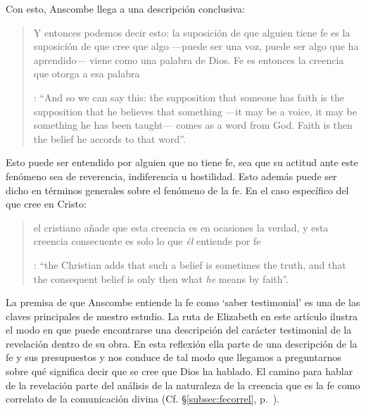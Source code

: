 Con esto, Anscombe llega a una descripción conclusiva: \blockquote[{\Cite[119-120]{anscombe1981erp:faith}}: \enquote{And so we can say this: the supposition that someone has faith is the supposition that he believes that something ---it may be a voice, it may be something he has been taught--- comes as a word from God. Faith is then the belief he accords to that word}.]{Y entonces podemos decir esto: la suposición de que alguien tiene fe es la suposición de que cree que algo ---puede ser una voz, puede ser algo que ha aprendido--- viene como una palabra de Dios. Fe es entonces la creencia que otorga a esa palabra}. Esto puede ser entendido por alguien que no tiene fe, sea que su actitud ante este fenómeno sea de reverencia, indiferencia u hostilidad. Esto además puede ser dicho en términos generales sobre el fenómeno de la fe. En el caso específico del que cree en Cristo: \blockquote[{\Cite[120]{anscombe1981erp:faith}}: \enquote{the Christian adds that such a belief is sometimes the truth, and that the consequent belief is only then what \emph{he} means by faith}.]{el cristiano añade que esta creencia es en ocasiones la verdad, y esta creencia consecuente es solo lo que \emph{él} entiende por fe}.

La premisa de que Anscombe entiende la fe como `saber testimonial' es una de las claves principales de nuestro estudio. La ruta de Elizabeth en este artículo ilustra 
el modo en que puede encontrarse una descripción del carácter testimonial de la revelación dentro de su obra. En esta reflexión ella parte de una descripción de la fe y sus presupuestos y nos conduce de tal modo que llegamos a preguntarnos sobre qué significa decir que se cree que Dios ha hablado. El camino para hablar de la revelación parte del análisis de la naturaleza de la creencia que es la fe como correlato de la comunicación divina (Cf. \S\ref{subsec:fecorrel}, p.~\pageref{subsec:fecorrel}).
